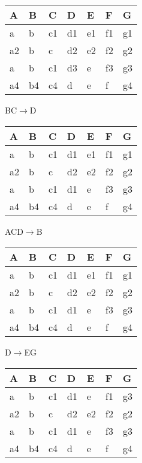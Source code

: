 \documentclass[]{article}
\begin{document}
	\begin{table}[H]
		\begin{tabular}{|l|l|l|l|l|l|l|}
			\hline
			A & B & C  & D  & E  & F  & G  \\ \hline
			a & b & c1 & d1 & e1 & f1 & g1 \\ \hline
			a2 & b & c & d2 & e2 & f2 & g2 \\ \hline
			a & b & c1 & d3 & e & f3 & g3 \\ \hline
			a4 & b4 & c4 & d & e & f & g4 \\ \hline
		\end{tabular}
	\end{table}

	BC$\rightarrow$D   \\
	
	\begin{table}[H]
		\begin{tabular}{|l|l|l|l|l|l|l|}
			\hline
			A & B & C  & D  & E  & F  & G  \\ \hline
			a & b & c1 & d1 & e1 & f1 & g1 \\ \hline
			a2 & b & c & d2 & e2 & f2 & g2 \\ \hline
			a & b & c1 & d1 & e & f3 & g3 \\ \hline
			a4 & b4 & c4 & d & e & f & g4 \\ \hline
		\end{tabular}
	\end{table}

	ACD$\rightarrow$B   \\
	
	\begin{table}[H]
		\begin{tabular}{|l|l|l|l|l|l|l|}
			\hline
			A & B & C  & D  & E  & F  & G  \\ \hline
			a & b & c1 & d1 & e1 & f1 & g1 \\ \hline
			a2 & b & c & d2 & e2 & f2 & g2 \\ \hline
			a & b & c1 & d1 & e & f3 & g3 \\ \hline
			a4 & b4 & c4 & d & e & f & g4 \\ \hline
		\end{tabular}
	\end{table}

	D$\rightarrow$EG   \\
	
	\begin{table}[H]
		\begin{tabular}{|l|l|l|l|l|l|l|}
			\hline
			A & B & C  & D  & E  & F  & G  \\ \hline
			a & b & c1 & d1 & e & f1 & g3 \\ \hline
			a2 & b & c & d2 & e2 & f2 & g2 \\ \hline
			a & b & c1 & d1 & e & f3 & g3 \\ \hline
			a4 & b4 & c4 & d & e & f & g4 \\ \hline
		\end{tabular}
	\end{table}
	
\end{document}
